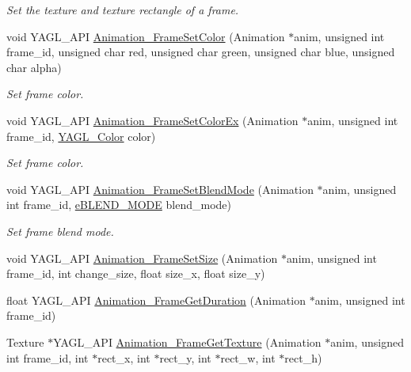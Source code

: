 \begin{DoxyCompactItemize}
\begin{DoxyCompactList}\small\item\em Set the texture and texture rectangle of a frame. \end{DoxyCompactList}\item 
void Y\-A\-G\-L\-\_\-\-A\-P\-I \hyperlink{group____animation_gac48bc01b23ae5213b74b4fad44988eb0}{Animation\-\_\-\-Frame\-Set\-Color} (Animation $\ast$anim, unsigned int frame\-\_\-id, unsigned char red, unsigned char green, unsigned char blue, unsigned char alpha)
\begin{DoxyCompactList}\small\item\em Set frame color. \end{DoxyCompactList}\item 
void Y\-A\-G\-L\-\_\-\-A\-P\-I \hyperlink{group____animation_gabb9fe48f2634ef1660d98c76afb907d1}{Animation\-\_\-\-Frame\-Set\-Color\-Ex} (Animation $\ast$anim, unsigned int frame\-\_\-id, \hyperlink{group____consts__color_gafe1825ea3ea95c415448a35dc1f1418d}{Y\-A\-G\-L\-\_\-\-Color} color)
\begin{DoxyCompactList}\small\item\em Set frame color. \end{DoxyCompactList}\item 
void Y\-A\-G\-L\-\_\-\-A\-P\-I \hyperlink{group____animation_ga85aefd29fbf1fa92f202a43795d1bf0d}{Animation\-\_\-\-Frame\-Set\-Blend\-Mode} (Animation $\ast$anim, unsigned int frame\-\_\-id, \hyperlink{group____enums_ga332b9dbc3141f0555a6deea6cffed74a}{e\-B\-L\-E\-N\-D\-\_\-\-M\-O\-D\-E} blend\-\_\-mode)
\begin{DoxyCompactList}\small\item\em Set frame blend mode. \end{DoxyCompactList}\item 
void Y\-A\-G\-L\-\_\-\-A\-P\-I \hyperlink{group____animation_gabe6718dd9a6919f3788fbd79381abd69}{Animation\-\_\-\-Frame\-Set\-Size} (Animation $\ast$anim, unsigned int frame\-\_\-id, int change\-\_\-size, float size\-\_\-x, float size\-\_\-y)
\item 
float Y\-A\-G\-L\-\_\-\-A\-P\-I \hyperlink{group____animation_ga12f784bda06af1e020703af35ed4c887}{Animation\-\_\-\-Frame\-Get\-Duration} (Animation $\ast$anim, unsigned int frame\-\_\-id)
\item 
Texture $\ast$Y\-A\-G\-L\-\_\-\-A\-P\-I \hyperlink{group____animation_ga11bb3d4c1bb6d69128d1b09c143eeeb3}{Animation\-\_\-\-Frame\-Get\-Texture} (Animation $\ast$anim, unsigned int frame\-\_\-id, int $\ast$rect\-\_\-x, int $\ast$rect\-\_\-y, int $\ast$rect\-\_\-w, int $\ast$rect\-\_\-h)

\end{DoxyCompactItemize}
